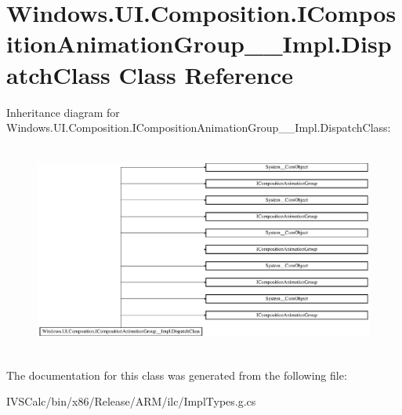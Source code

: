 \hypertarget{class_windows_1_1_u_i_1_1_composition_1_1_i_composition_animation_group_____impl_1_1_dispatch_class}{}\section{Windows.\+U\+I.\+Composition.\+I\+Composition\+Animation\+Group\+\_\+\+\_\+\+Impl.\+Dispatch\+Class Class Reference}
\label{class_windows_1_1_u_i_1_1_composition_1_1_i_composition_animation_group_____impl_1_1_dispatch_class}
Inheritance diagram for Windows.\+U\+I.\+Composition.\+I\+Composition\+Animation\+Group\+\_\+\+\_\+\+Impl.\+Dispatch\+Class\+:\begin{figure}[H]
\begin{center}
\leavevmode
\includegraphics[height=6.968326cm]{class_windows_1_1_u_i_1_1_composition_1_1_i_composition_animation_group_____impl_1_1_dispatch_class}
\end{center}
\end{figure}


The documentation for this class was generated from the following file\+:\begin{DoxyCompactItemize}
\item 
I\+V\+S\+Calc/bin/x86/\+Release/\+A\+R\+M/ilc/Impl\+Types.\+g.\+cs\end{DoxyCompactItemize}
